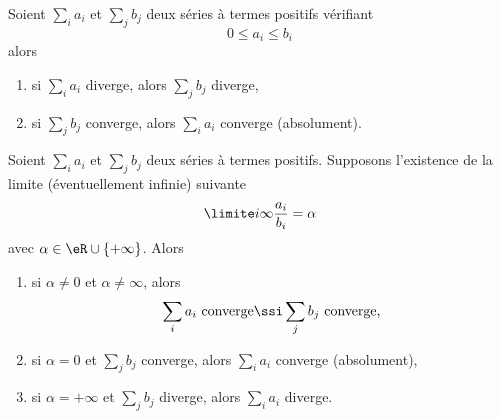 \begin{lemma}   \label{LemgHWyfG}
Soient $\sum_i a_i$ et $\sum_j
b_j$ deux séries à termes positifs vérifiant
\begin{equation*}
  0 \leq a_i \leq b_i
\end{equation*}
alors
\begin{enumerate}
\item si $\sum_i a_i$ diverge, alors $\sum_j b_j$ diverge,
\item si $\sum_j b_j$ converge, alors $\sum_i a_i$ converge
  (absolument).
  \end{enumerate}
\end{lemma}

\begin{proposition}
 Soient $\sum_i a_i$ et $\sum_j b_j$ deux séries à termes positifs. Supposons l'existence de la limite (éventuellement infinie) suivante
\begin{equation}
  \limite i \infty \frac{a_i}{b_i} = \alpha
\end{equation}
avec \( \alpha\in \eR\cup\{ +\infty \}\). Alors
\begin{enumerate}
\item si $\alpha \neq 0$ et $\alpha\neq \infty$, alors
  \begin{equation}
    \sum_i a_i \text{~converge} \ssi \sum_j b_j\text{~converge,}
  \end{equation}
\item si $\alpha = 0$ et $\sum_j b_j$ converge, alors $\sum_i a_i$
  converge (absolument),
\item si $\alpha = +\infty$ et $\sum_j b_j$ diverge, alors $\sum_i
  a_i$ diverge.
\end{enumerate}
\end{proposition}

